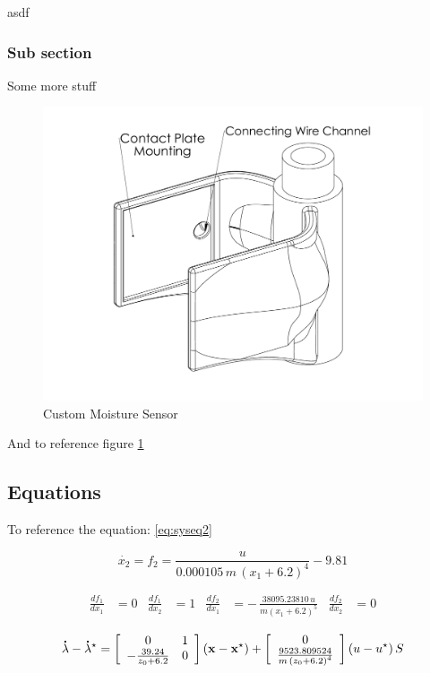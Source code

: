asdf

\subsubsection{Sub section}

Some more stuff

\begin{figure}[h]
    \centering
    \includegraphics[width=.5\textwidth]{images/MoistureSensor}
    \caption{Custom Moisture Sensor}
    \label{fig:moistureSensor}
\end{figure}

And to reference figure \ref{fig:moistureSensor}

\subsection{Equations}

To reference the equation: \ref{eq:syseq2}

\begin{equation}
	\label{eq:syseq2}
	\dot{x_2} = f_2 = {\frac {u}{0.000105\,m\,\left(x_1 + 6.2 \right) ^{4}}} - 9.81
\end{equation}


\begin{align}
	\label{eq:fderivA}
	 {\frac {df_1}{dx_1}} &= 0 &  {\frac {df_1}{dx_2}} &=1 &  {\frac {df_2}{dx_1}} &= - \,{\frac {38095.23810\,u}{m\left( x_1 + 6.2 \right) ^{5}}} &  {\frac {df_2}{dx_2}} &=0
\end{align}


\begin{equation}
	\label{eq:finalLinearizedx}
	{\bf \dot{\lambda}} - {\bf \dot{\lambda}^\star} = 
	\left[
		\begin{array}{cc}
			 0 & 1 \\
			 -{\frac {39.24}{z_0 + 6.2}} & 0 \\
		\end{array}
	\right]
	\left(
		{\bf x} - {\bf x^\star}
	\right)
	+ 
	\left[
		\begin{array}{c}
			 0 \\
			{\frac {9523.809524}{m\,\left( z_0 + 6.2 \right) ^{4}}} \\
		\end{array}
	\right]
	\left(
		u - u^\star
	\right)S
\end{equation}
